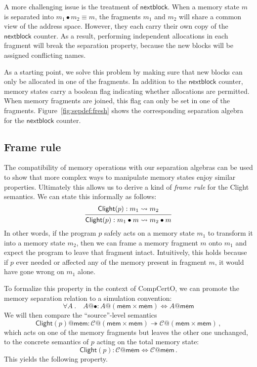 \documentclass[acmsmall,screen,review,anonymous]{acmart}
\newcommand{\kw}[1]{\ensuremath{ \mathsf{#1} }}
\begin{document}
A more challenging issue is the treatment of $\kw{nextblock}$.
When a memory state $m$ is separated into $m_1 \bullet m_2 \equiv m$,
the fragments $m_1$ and $m_2$ will share a common view of the address space.
However,
they each carry their own copy of the $\kw{nextblock}$ counter.
As a result,
performing independent allocations in each fragment
will break the separation property,
because the new blocks will be assigned conflicting names.

As a starting point,
we solve this problem by
making sure that new blocks
can only be allocated in one of the fragments.
In addition to the $\kw{nextblock}$ counter,
memory states carry a boolean flag
indicating whether allocations are permitted.
When memory fragments are joined,
this flag can only be set in one of the fragments.
Figure~\ref{fig:sepdef:fresh}
shows the corresponding separation algebra
for the $\kw{nextblock}$ counter.


\subsection{Frame rule} %

The compatibility of memory operations with our separation algebras
can be used to show that
more complex ways to manipulate memory states
enjoy similar properties.
Ultimately this allows us to derive
a kind of \emph{frame rule} for the Clight semantics.
We can state this informally as follows:
\[
  \begin{prooftree}
    \hypo{\kw{Clight}(p) : m_1 \leadsto m_2}
    \infer1{\kw{Clight}(p) : m_1 \bullet m \leadsto m_2 \bullet m}
  \end{prooftree}
\]
In other words,
if the program $p$ safely acts on a memory state $m_1$
to transform it into a memory state $m_2$,
then we can frame a memory fragment $m$ onto $m_1$
and expect the program to leave that fragment intact.
Intuitively, this holds because
if $p$ ever needed or affected any of the memory present
in fragment $m$,
it would have gone wrong on $m_1$ alone.

To formalize this property in the context of CompCertO,
we can promote the memory separation relation
to a simulation convention:
\[
  \forall A \:.\quad
  A@{\bullet} : A@(\kw{mem} \times \kw{mem}) \Leftrightarrow A@\kw{mem}
\]
We will then compare the ``source''-level semantics
\[
  \kw{Clight}(p)@\kw{mem} :
    \mathcal{C}@(\kw{mem} \times \kw{mem}) \twoheadrightarrow
    \mathcal{C}@(\kw{mem} \times \kw{mem})
  \,,
\]
which acts on one of the memory fragments
but leaves the other one unchanged,
to the concrete semantics of $p$ acting on the total memory state:
\[
  \kw{Clight}(p) : \mathcal{C}@\kw{mem} \Leftrightarrow \mathcal{C}@\kw{mem}
  \,.
\]
This yields the following property.
\end{document}
